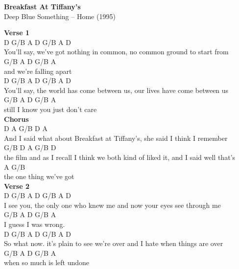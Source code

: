 \documentclass[a4paper]{article}
\begin{document}
    \begin{center}
        \textbf{Breakfast At Tiffany's}
        ~\\
        Deep Blue Something -- Home (1995)
    \end{center}
    {
        \scriptsize
        \textbf{Verse 1}
        ~\\
        {
            \cutive
            \obeyspaces
       D    G/B       A          D          G/B    A         D
\\
You'll say, we've got nothing in common, no common ground to start from
\\
       G/B      A     D     G/B     A
\\
   and we're falling apart
\\
       D        G/B       A      D             G/B        A      D
\\
You'll say, the world has come between us, our lives have come between us
\\
         G/B    A              D     G/B     A
\\
   still I know you just don't care
\\

        }
        \textbf{Chorus}
        ~\\
        {
            \cutive
            \obeyspaces
     D                A            G/B            D                A
\\
And I said what about Breakfast at Tiffany's, she said I think I remember 
\\
       G/B         D                   A            G/B           D
\\
   the film and as I recall I think we both kind of liked it, and I said well that's
\\
       A               G/B
\\
   the one thing we've got
\\

        }
        \textbf{Verse 2}
        ~\\
        {
            \cutive
            \obeyspaces
   D           G/B   A      D           G/B        A      D
\\
I see you, the only one who knew me and now your eyes see through me 
\\
G/B  A      D         G/B        A
\\
   I guess I was wrong.
\\
   D              G/B      A         D          G/B       A           D
\\
So what now. it's plain to see we're over and I hate when things are over 
\\
        G/B        A      D     G/B     A
\\
   when so much is left undone
\\

}}
\end{document}
